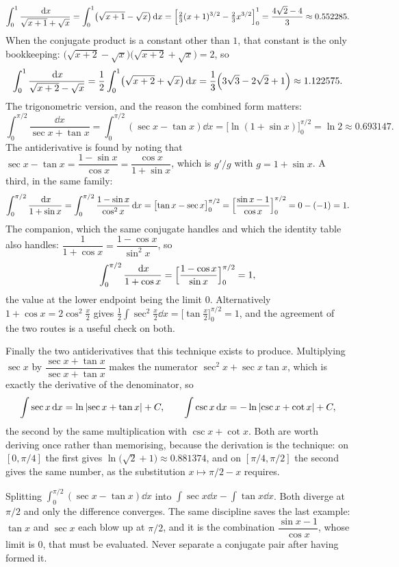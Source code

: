 \begin{worked}
\[
\int_0^1\frac{\,\mathrm{d} x}{\sqrt{x+1}+\sqrt x}=\int_0^1\bigl(\sqrt{x+1}-\sqrt x\bigr)\,\mathrm{d} x=\Bigl[\tfrac23(x+1)^{3/2}-\tfrac23x^{3/2}\Bigr]_0^1=\frac{4\sqrt2-4}{3}\approx0.552285 .
\]
When the conjugate product is a constant other than $1$, that constant is the only bookkeeping: $\bigl(\sqrt{x+2}-\sqrt x\bigr)\bigl(\sqrt{x+2}+\sqrt x\bigr)=2$, so
\[
\int_0^1\frac{\,\mathrm{d} x}{\sqrt{x+2}-\sqrt x}=\frac12\int_0^1\bigl(\sqrt{x+2}+\sqrt x\bigr)\,\mathrm{d} x
=\frac13\Bigl(3\sqrt3-2\sqrt2+1\Bigr)\approx1.122575 .
\]
The trigonometric version, and the reason the combined form matters:
\[
\int_0^{\pi/2}\frac{\dd x}{\sec x+\tan x}=\int_0^{\pi/2}(\sec x-\tan x)\dd x=\bigl[\ln(1+\sin x)\bigr]_0^{\pi/2}=\ln2\approx0.693147 .
\]
The antiderivative is found by noting that $\sec x-\tan x=\dfrac{1-\sin x}{\cos x}=\dfrac{\cos x}{1+\sin x}$, which is $g'/g$ with $g=1+\sin x$. A third, in the same family:
\[
\int_0^{\pi/2}\frac{\,\mathrm{d} x}{1+\sin x}=\int_0^{\pi/2}\frac{1-\sin x}{\cos^2x}\,\mathrm{d} x=\bigl[\tan x-\sec x\bigr]_0^{\pi/2}=\Bigl[\frac{\sin x-1}{\cos x}\Bigr]_0^{\pi/2}=0-(-1)=1 .
\]
The companion, which the same conjugate handles and which the identity table also handles: $\dfrac{1}{1+\cos x}=\dfrac{1-\cos x}{\sin^2 x}$, so
\[
\int_0^{\pi/2}\frac{\,\mathrm{d} x}{1+\cos x}=\Bigl[\frac{1-\cos x}{\sin x}\Bigr]_0^{\pi/2}=1 ,
\]
the value at the lower endpoint being the limit $0$. Alternatively $1+\cos x=2\cos^2\tfrac x2$ gives $\tfrac12\int\sec^2\tfrac x2\dd x=\bigl[\tan\tfrac x2\bigr]_0^{\pi/2}=1$, and the agreement of the two routes is a useful check on both.

Finally the two antiderivatives that this technique exists to produce. Multiplying $\sec x$ by $\dfrac{\sec x+\tan x}{\sec x+\tan x}$ makes the numerator $\sec^2x+\sec x\tan x$, which is exactly the derivative of the denominator, so
\[
\int\sec x\,\mathrm{d} x=\ln\left\lvert \sec x+\tan x\right\rvert+C,
\qquad
\int\csc x\,\mathrm{d} x=-\ln\left\lvert \csc x+\cot x\right\rvert+C ,
\]
the second by the same multiplication with $\csc x+\cot x$. Both are worth deriving once rather than memorising, because the derivation is the technique: on $[0,\pi/4]$ the first gives $\ln\bigl(\sqrt2+1\bigr)\approx0.881374$, and on $[\pi/4,\pi/2]$ the second gives the same number, as the substitution $x\mapsto\pi/2-x$ requires.
\end{worked}

\begin{trap}
Splitting $\int_0^{\pi/2}(\sec x-\tan x)\dd x$ into $\int\sec x\dd x-\int\tan x\dd x$. Both diverge at $\pi/2$ and only the difference converges. The same discipline saves the last example: $\tan x$ and $\sec x$ each blow up at $\pi/2$, and it is the combination $\dfrac{\sin x-1}{\cos x}$, whose limit is $0$, that must be evaluated. Never separate a conjugate pair after having formed it.
\end{trap}

